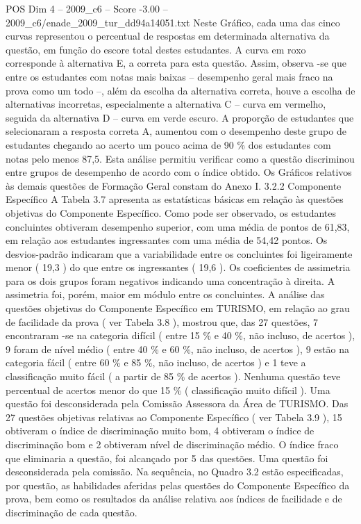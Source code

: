 \begin{textsample}{POS Dim 4 – 2009\_c6 – Score -3.00 – 2009\_c6/enade\_2009\_tur\_dd94a14051.txt}
Neste Gráfico, cada uma das cinco curvas representou o percentual de respostas em determinada alternativa da questão, em função do escore total destes estudantes.
A curva em roxo corresponde à alternativa E, a correta para esta questão.
Assim, observa -se que entre os estudantes com notas mais baixas – desempenho geral mais fraco na prova como um todo –, além da escolha da alternativa correta, houve a escolha de alternativas incorretas, especialmente a alternativa C – curva em vermelho, seguida da alternativa D – curva em verde escuro.
A proporção de estudantes que selecionaram a resposta correta A, aumentou com o desempenho deste grupo de estudantes chegando ao acerto um pouco acima de 90 \% dos estudantes com notas pelo menos 87,5.
Esta análise permitiu verificar como a questão discriminou entre grupos de desempenho de acordo com o índice obtido.
Os Gráficos relativos às demais questões de Formação Geral constam do Anexo I. 3.2.2 Componente Específico A Tabela 3.7 apresenta as estatísticas básicas em relação às questões objetivas do Componente Específico.
Como pode ser observado, os estudantes concluintes obtiveram desempenho superior, com uma média de pontos de 61,83, em relação aos estudantes ingressantes com uma média de 54,42 pontos.
Os desvios-padrão indicaram que a variabilidade entre os concluintes foi ligeiramente menor ( 19,3 ) do que entre os ingressantes ( 19,6 ).
Os coeficientes de assimetria para os dois grupos foram negativos indicando uma concentração à direita.
A assimetria foi, porém, maior em módulo entre os concluintes.
A análise das questões objetivas do Componente Específico em TURISMO, em relação ao grau de facilidade da prova ( ver Tabela 3.8 ), mostrou que, das 27 questões, 7 encontraram -se na categoria difícil ( entre 15 \% e 40 \%, não incluso, de acertos ), 9 foram de nível médio ( entre 40 \% e 60 \%, não incluso, de acertos ), 9 estão na categoria fácil ( entre 60 \% e 85 \%, não incluso, de acertos ) e 1 teve a classificação muito fácil ( a partir de 85 \% de acertos ).
Nenhuma questão teve percentual de acertos menor do que 15 \% ( classificação muito difícil ).
Uma questão foi desconsiderada pela Comissão Assessora da Área de TURISMO.
Das 27 questões objetivas relativas ao Componente Específico ( ver Tabela 3.9 ), 15 obtiveram o índice de discriminação muito bom, 4 obtiveram o índice de discriminação bom e 2 obtiveram nível de discriminação médio.
O índice fraco que eliminaria a questão, foi alcançado por 5 das questões.
Uma questão foi desconsiderada pela comissão.
Na sequência, no Quadro 3.2 estão especificadas, por questão, as habilidades aferidas pelas questões do Componente Específico da prova, bem como os resultados da análise relativa aos índices de facilidade e de discriminação de cada questão.

\end{textsample}
